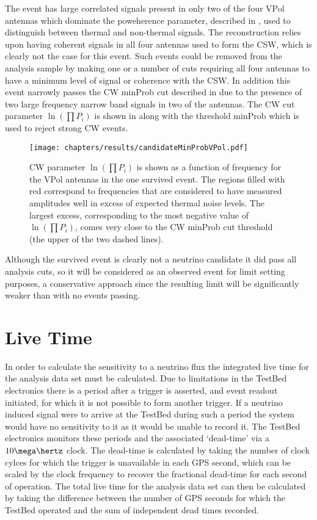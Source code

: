 The event has large correlated signals present in only two of the four VPol antennas which dominate the poweherence parameter, described in , used to distinguish between thermal and non-thermal signals. The reconstruction relies upon having coherent signals in all four antennas used to form the CSW, which is clearly not the case for this event. Such events could be removed from the analysis sample by making one or a number of cuts requiring all four antennas to have a minimum level of signal or coherence with the CSW. In addition this event narrowly passes the CW minProb cut described in  due to the presence of two large frequency narrow band signals in two of the antennas. The CW cut parameter $\ln (\prod P_{i})$ is shown in  along with the threshold minProb which is used to reject strong CW events.


\begin{figure}
  \texttt{[image: chapters/results/candidateMinProbVPol.pdf]}
  \caption{CW parameter $\ln (\prod P_{i})$ is shown as a function of frequency for the VPol antennas in the one survived event. The regions filled with red correspond to frequencies that are considered to have measured amplitudes well in excess of expected thermal noise levels. The largest excess, corresponding to the most negative value of $\ln (\prod P_{i})$, comes very close to the CW minProb cut threshold (the upper of the two dashed lines).}
  \label{fig:Results:minProb}
\end{figure}


Although the survived event is clearly not a neutrino candidate it did pass all analysis cuts, so it will be considered as an observed event for limit setting purposes, a conservative approach since the resulting limit will be significantly weaker than with no events passing. 


\section{Live Time}
\label{sec:Live-Time}

In order to calculate the sensitivity to a neutrino flux the integrated live time for the analysis data set must be calculated. Due to limitations in the TestBed electronics there is a period after a trigger is asserted, and event readout initiated, for which it is not possible to form another trigger. If a neutrino induced signal were to arrive at the TestBed during such a period the system would have no sensitivity to it as it would be unable to record it. The TestBed electronics monitors these periods and the associated `dead-time' via a $10 \mega \hertz$ clock. The dead-time is calculated by taking the number of clock cylces for which the trigger is unavailable in each GPS second, which can be scaled by the clock frequency to recover the fractional dead-time for each second of operation. The total live time for the analysis data set can then be calculated by taking the difference between the number of GPS seconds for which the TestBed operated and the sum of independent dead times recorded. 

